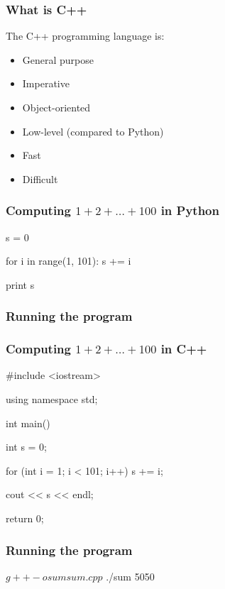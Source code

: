 \begin{frame}
  \frametitle{What is C++}

  The C++ programming language is:

  \begin{itemize}
  \item
    General purpose
  \item
    Imperative
  \item
    Object-oriented
  \item
    Low-level (compared to Python)
  \item
    Fast
  \item
    Difficult
  \end{itemize}

\end{frame}

\begin{frame}[fragile]
  \frametitle{Computing $1 + 2 + \ldots + 100$ in Python}

\begin{python}
s = 0

for i in range(1, 101):
    s += i

print s
\end{python}

\end{frame}

\begin{frame}[fragile]
  \frametitle{Running the program}


\end{frame}

\begin{frame}[fragile]
  \frametitle{Computing $1 + 2 + \ldots + 100$ in C++}

\begin{c++}
#include <iostream>

using namespace std;

int main()
{
  int s = 0;

  for (int i = 1; i < 101; i++)
    s += i;

  cout << s << endl;

  return 0;
}
\end{c++}

\end{frame}

\begin{frame}[fragile]
  \frametitle{Running the program}

\begin{bash}
$ g++ -o sum sum.cpp
$ ./sum
5050
\end{bash}

\end{frame}

